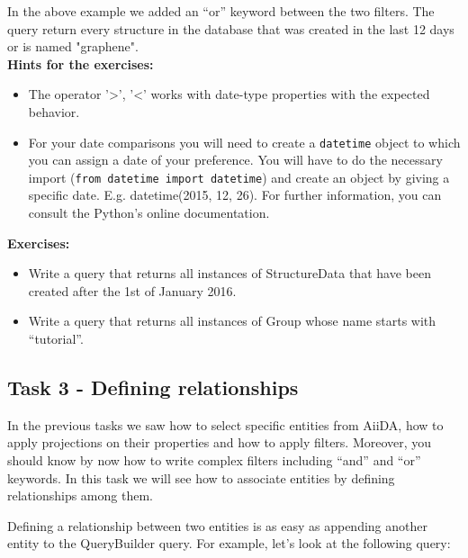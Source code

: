 In the above example we added an ``or'' keyword between the two filters.
The query return every structure in the database that was created
in the last 12 days or is named "graphene". \\
\textbf{Hints for the exercises:}
\begin{itemize}
\item The operator '>', '<' works with date-type properties with the expected behavior.
\item For your date comparisons you will need to create a \texttt{datetime} object to which you can assign a date of your preference.
 You will have to do the necessary import (\texttt{from datetime import datetime}) and create an object by giving a specific date.
 E.g. datetime(2015, 12, 26). For further information, you can consult the Python's online documentation.
\end{itemize}

\begin{tcolorbox}
\textbf{Exercises:}
\begin{itemize}
\item
Write a query that returns all instances of StructureData that have been created after the 1st of January 2016.
\item
Write a query that returns all instances of Group whose name starts with ``tutorial''.
\end{itemize}
\end{tcolorbox}


\subsection*{Task 3 - Defining relationships}
In the previous tasks we saw how to select specific entities from AiiDA, how to apply projections
on their properties and how to apply filters.
Moreover, you should know by now how to write complex filters including ``and'' and ``or'' keywords.
In this task we will see how to associate entities by defining relationships among them.

Defining a relationship between two entities is as easy as appending another entity to the QueryBuilder query.
For example, let's look at the following query:

